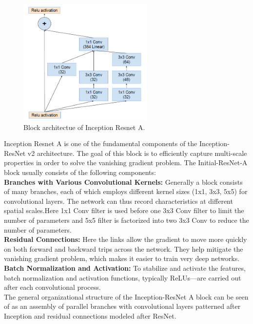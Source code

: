 \documentclass[a4paper,12pt,oneside]{book}
\begin{document}
\begin{figure}[!hbtp]
\centering
\includegraphics[width=0.6\textwidth]{Figures/inception_resnet_A.png}
\captionsetup{font=small}
\caption{Block architectue of Inception Resnet A.}
\label{fig:resnet}
\end{figure}
Inception Resnet A is one of the fundamental components of the Inception-ResNet v2 architecture. The goal of this block is to efficiently capture multi-scale properties in order to solve the vanishing gradient problem.
The Initial-ResNet-A block usually consists of the following components:\\
\textbf{Branches with Various Convolutional Kernels:}
Generally a block consists of many branches, each of which employs different kernel sizes (1x1, 3x3, 5x5) for convolutional layers. The network can thus record characteristics at different spatial scales.Here 1x1 Conv filter is used before one 3x3 Conv filter to limit the number of parameters and 5x5 filter is factorized into two 3x3 Conv to reduce the number of parameters.\\
\textbf{Residual Connections:}
Here the links allow the gradient to move more quickly on both forward and backward trips across the network. They help mitigate the vanishing gradient problem, which makes it easier to train very deep networks.\\
\textbf{Batch Normalization and Activation:}
To stabilize and activate the features, batch normalization and activation functions, typically ReLUs—are carried out after each convolutional process.\\
The general organizational structure of the Inception-ResNet A block can be seen of as an assembly of parallel branches with convolutional layers patterned after Inception and residual connections modeled after ResNet.
\end{document}

